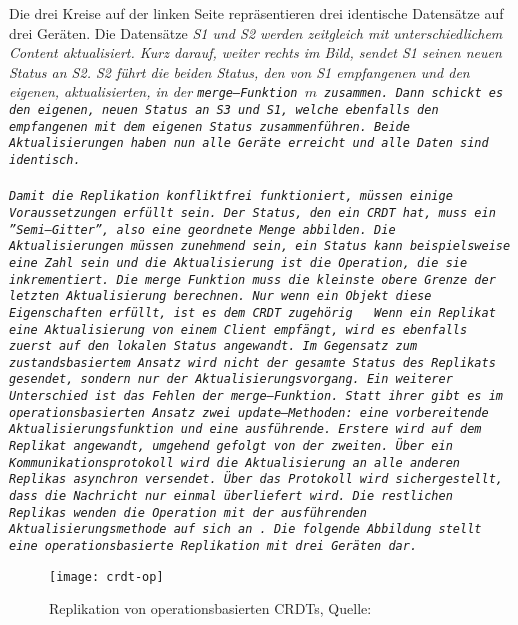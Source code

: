 %
Die drei Kreise auf der linken Seite repräsentieren drei identische Datensätze auf drei Geräten.
Die Datensätze \it{S1} und \it{S2} werden zeitgleich mit unterschiedlichem Content aktualisiert.
Kurz darauf, weiter rechts im Bild, sendet \it{S1} seinen neuen Status an \it{S2}.
\it{S2} führt die beiden Status, den von \it{S1} empfangenen und den eigenen, aktualisierten, in der \tt{merge}--Funktion $m$ zusammen.
Dann schickt es den eigenen, neuen Status an \it{S3} und \it{S1}, welche ebenfalls den empfangenen mit dem eigenen Status zusammenführen. Beide Aktualisierungen haben nun alle Geräte erreicht und alle Daten sind identisch.\\\\
%
Damit die Replikation konfliktfrei funktioniert, müssen einige Voraussetzungen erfüllt sein.
Der Status, den ein \gls{CRDT} hat, muss ein ''Semi--Gitter'', also eine geordnete Menge abbilden.
Die Aktualisierungen müssen zunehmend sein, ein Status kann beispielsweise eine Zahl sein und die Aktualisierung ist die Operation, die sie inkrementiert.
Die \tt{merge} Funktion muss die kleinste obere Grenze der letzten Aktualisierung berechnen.
Nur wenn ein Objekt diese Eigenschaften erfüllt, ist es dem \gls{CRDT} zugehörig ~\cite{crdt_shapiro2}
%
%
%
Wenn ein Replikat eine Aktualisierung von einem Client empfängt, wird es ebenfalls zuerst auf den lokalen Status angewandt.
Im Gegensatz zum zustandsbasiertem Ansatz wird nicht der gesamte Status des Replikats gesendet, sondern nur der Aktualisierungsvorgang.
Ein weiterer Unterschied ist das Fehlen der \tt{merge}--Funktion. Statt ihrer gibt es im operationsbasierten Ansatz zwei \tt{update}--Methoden: eine vorbereitende Aktualisierungsfunktion und eine ausführende. Erstere wird auf dem Replikat angewandt, umgehend gefolgt von der zweiten.
Über ein Kommunikationsprotokoll wird die Aktualisierung an alle anderen Replikas asynchron versendet.
Über das Protokoll wird sichergestellt, dass die Nachricht nur einmal überliefert wird.
Die restlichen Replikas wenden die Operation mit der ausführenden Aktualisierungsmethode auf sich an~\cite{crdt_shapiro2}.
Die folgende Abbildung stellt eine operationsbasierte Replikation mit drei Geräten dar.
%
\begin{figure}[H]
  \centering
  \texttt{[image: crdt-op]}
  \grayRule
  \caption[Replikation von operationsbasierten \gls{CRDT}]{Replikation von operationsbasierten \glspl{CRDT}, Quelle: ~\cite{crdt_shapiro2}}
  \label{fig:crdt-op}
\end{figure}
